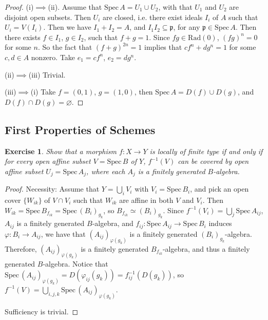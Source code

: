 \documentclass{amsart}
\newtheorem{exe}{Exercise}[subsection]
\begin{document}
\begin{proof}
(i)$\implies$(ii). Assume that $\mathrm{Spec}\,A=U_1\cup U_2$, with that $U_1$ and $U_2$ are disjoint open subsets. Then $U_i$ are closed, i.e. there exist ideals $I_i$ of $A$ such that $U_i=V(I_i)$.
Then we have $I_1+I_2=A$, and $I_1I_2\subseteq \mathfrak{p}$,  for any $\mathfrak{p}\in \mathrm{Spec}\,A$. Then there exists $f\in I_1$, $g\in I_2$, such that $f+g=1$. Since $fg\in \mathrm{Rad}(0)$,
$(fg)^n=0$ for some $n$. So the fact that $(f+g)^{2n}=1$ implies that $cf^n+dg^n=1$ for some $c,d\in A$ nonzero. Take $e_1=cf^n$, $e_2=dg^n$.

(ii)$\implies$(iii) Trivial.

(iii)$\implies$(i) Take $f=(0,1)$, $g=(1,0)$, then $\mathrm{Spec}\,A= D(f)\cup D(g)$, and $D(f)\cap D(g)=\varnothing$.
\end{proof}

\subsection{First Properties of Schemes}

\begin{exe}
	\label{2.3.1}
Show that a morphism $f: X\rightarrow Y $ is locally of finite type if and only if for every open affine
subset $V=\mathrm{Spec}\,B$ of $Y$, $f^{-1}(V)$ can be covered by open affine subset $U_j=\mathrm{Spec}\,A_j$, where each $A_j$ is a
finitely generated $B$-algebra.
\end{exe}

\begin{proof}
Necessity: Assume that $Y=\bigcup_i V_i$ with $V_i= \mathrm{Spec}\,B_i$, and pick an open cover $\{W_{ik}\}$ of $ V\cap V_i$ such that $W_{ik}$ are affine in both $V$ and $V_i$. Then $W_{ik}=\mathrm{Spec}\,B_{f_{ik}}=\mathrm{Spec}\,(B_{i})_{g_k}$, so $B_{f_{ik}}\simeq (B_{i})_{g_k}$. Since $f^{-1}(V_i)=\bigcup_j \mathrm{Spec}\,A_{ij}$, $A_{ij}$ is a finitely generated $B$-algebra, and
$f_{ij}:\mathrm{Spec}\,A_{ij}\rightarrow \mathrm{Spec}\,B_i$ induces $\varphi : B_i\rightarrow A_{ij} $, we have that $(A_{ij})_{\varphi(g_k)}$ is
a finitely generated $(B_{i})_{g_k}$-algebra. Therefore, $(A_{ij})_{\varphi(g_k)}$ is a finitely generated $B_{f_{ik}}$-algebra, and thus a finitely generated $B$-algebra. Notice that $\mathrm{Spec}\,(A_{ij})_{\varphi(g_k)}=D(\varphi _{ij}(g_k))=f_{ij}^{-1}(D(g_k))$, so 
$f^{-1}(V)=\bigcup_{i,j,k} \mathrm{Spec}\,(A_{ij})_{\varphi(g_k)}$.

 Sufficiency is trivial.
\end{proof}
\end{document}
